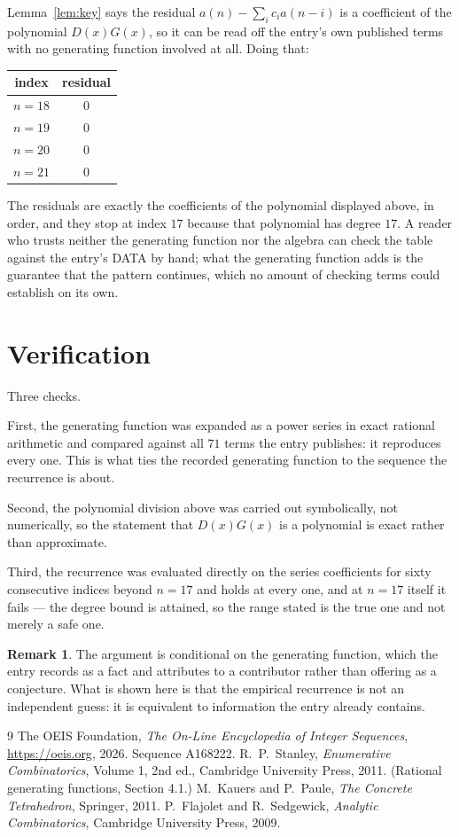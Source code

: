 \documentclass[11pt,a4paper]{article}
\theoremstyle{plain}
\theoremstyle{definition}
\newtheorem{remark}[theorem]{Remark}
\begin{document}
Lemma~\ref{lem:key} says the residual $a(n)-\sum_ic_ia(n-i)$ is a coefficient of the
polynomial $D(x)G(x)$, so it can be read off the entry's own published terms with no
generating function involved at all. Doing that:
\begin{center}
\begin{tabular}{cc}
index & residual \\ \hline
$n=18$ & $0$ \\
$n=19$ & $0$ \\
$n=20$ & $0$ \\
$n=21$ & $0$
\end{tabular}
\end{center}
The residuals are exactly the coefficients of the polynomial displayed above, in order, and
they stop at index $17$ because that polynomial has degree $17$. A reader who trusts
neither the generating function nor the algebra can check the table against the entry's DATA
by hand; what the generating function adds is the guarantee that the pattern continues, which
no amount of checking terms could establish on its own.

\section{Verification}

Three checks.

First, the generating function was expanded as a power series in exact rational arithmetic and
compared against all $71$ terms the entry publishes: it reproduces every one. This is
what ties the recorded generating function to the sequence the recurrence is about.

Second, the polynomial division above was carried out symbolically, not numerically, so the
statement that $D(x)G(x)$ is a polynomial is exact rather than approximate.

Third, the recurrence was evaluated directly on the series coefficients for sixty consecutive
indices beyond $n=17$ and holds at every one, and at $n=17$ itself it fails --- the
degree bound is attained, so the range stated is the true one and not merely a safe one.

\begin{remark}
The argument is conditional on the generating function, which the entry records as a fact and
attributes to a contributor rather than offering as a conjecture. What is shown here is that
the empirical recurrence is not an independent guess: it is equivalent to information the
entry already contains.
\end{remark}

\begin{thebibliography}{9}
 The OEIS Foundation, \emph{The On-Line Encyclopedia of Integer
Sequences}, \url{https://oeis.org}, 2026. Sequence A168222.
 R.~P.~Stanley, \emph{Enumerative Combinatorics}, Volume 1, 2nd ed.,
Cambridge University Press, 2011. (Rational generating functions, Section 4.1.)
 M.~Kauers and P.~Paule, \emph{The Concrete Tetrahedron}, Springer, 2011.
 P.~Flajolet and R.~Sedgewick, \emph{Analytic Combinatorics}, Cambridge
University Press, 2009.
\end{thebibliography}
\end{document}
